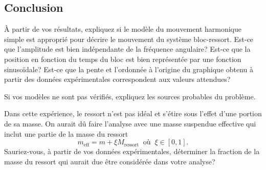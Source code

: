 \documentclass[]{article}
\begin{document}
\hypertarget{conclusion}{%
\subsection*{Conclusion}\label{conclusion}}

À partir de vos résultats, expliquez si le modèle du mouvement
harmonique simple est approprié pour décrire le mouvement du système
bloc-ressort. Est-ce que l'amplitude est bien indépendante de la
fréquence angulaire? Est-ce que la position en fonction du temps du bloc
est bien représentée par une fonction sinusoïdale? Est-ce que la pente
et l'ordonnée à l'origine du graphique obtenu à partir des données
expérimentales correspondent aux valeurs attendues?

Si vos modèles ne sont pas vérifiés, expliquez les sources probables du
problème.

Dans cette expérience, le ressort n'est pas idéal et s'étire sous
l'effet d'une portion de sa masse. On aurait dû faire l'analyse avec une
masse suspendue effective qui inclut une partie de la masse du ressort
\[m_\mathrm{eff} = m + \xi M_\mathrm{ressort} \;\;\text{où}\;\; \xi \in [0, 1].\]
Sauriez-vous, à partir de vos données expérimentales, déterminer la
fraction de la masse du ressort qui aurait due être considérée dans
votre analyse?
\end{document}
